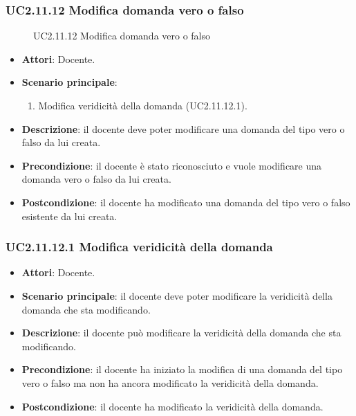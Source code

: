 \subsubsection{UC2.11.12 Modifica domanda vero o falso}
\begin{figure}[H]
\centering
\noindent{}
\caption{UC2.11.12 Modifica domanda vero o falso}
\end{figure}
\begin{itemize}
\item \textbf{Attori}: Docente.
\item \textbf{Scenario principale}:
\begin{enumerate}
\item Modifica veridicità della domanda (UC2.11.12.1).
\end{enumerate}
\item \textbf{Descrizione}: il docente deve poter modificare una domanda del tipo vero o falso da lui creata.
\item \textbf{Precondizione}: il docente è stato riconosciuto e vuole modificare una domanda vero o falso da lui creata.
\item \textbf{Postcondizione}: il docente ha modificato una domanda del tipo vero o falso esistente da lui creata.
\end{itemize}
\subsubsection{UC2.11.12.1 Modifica veridicità della domanda}
\begin{itemize}
\item \textbf{Attori}: Docente.
\item \textbf{Scenario principale}: il docente deve poter modificare la veridicità della domanda che sta modificando.
\item \textbf{Descrizione}: il docente può modificare la veridicità della domanda che sta modificando.
\item \textbf{Precondizione}: il docente ha iniziato la modifica di una domanda del tipo vero o falso ma non ha ancora modificato la veridicità della domanda.
\item \textbf{Postcondizione}: il docente ha modificato la veridicità della domanda.
\end{itemize}
